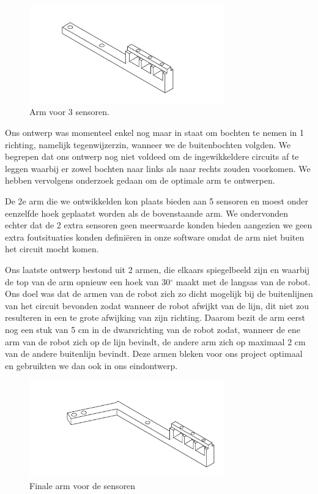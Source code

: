 \begin{figure}[H]
\centering
\includegraphics[width=0.75\textwidth]{3sensoren.png}
\caption{Arm voor 3 sensoren. \label{fig:3sensoren}}
\end{figure}


Ons ontwerp was momenteel enkel nog maar in staat om bochten te nemen in 1 richting, namelijk tegenwijzerzin, wanneer we de buitenbochten volgden. We begrepen dat ons ontwerp nog niet voldeed om de ingewikkeldere circuits af te leggen waarbij er zowel bochten naar links als naar rechts zouden voorkomen. We hebben vervolgens onderzoek gedaan om de optimale arm te ontwerpen.

De 2e arm die we ontwikkelden kon plaats bieden aan 5 sensoren en moest onder eenzelfde hoek geplaatst worden als de bovenstaande arm. We ondervonden echter dat de 2 extra sensoren geen meerwaarde konden bieden aangezien we geen extra foutsituaties konden defini\"eren in onze software omdat de arm niet buiten het circuit mocht komen. 

Ons laatste ontwerp bestond uit 2 armen, die elkaars spiegelbeeld zijn en waarbij de top van de arm opnieuw een hoek van 30$^\circ$ maakt met de langsas van de robot. Ons doel was dat de armen van de robot zich zo dicht mogelijk bij de buitenlijnen van het circuit bevonden zodat wanneer de robot afwijkt van de lijn, dit niet zou resulteren in een te grote afwijking van zijn richting. Daarom bezit de arm eerst nog een stuk van 5 cm in de dwarsrichting van de robot zodat, wanneer de ene arm van de robot zich op de lijn bevindt, de andere arm zich op maximaal 2 cm van de andere buitenlijn bevindt. Deze armen bleken voor ons project optimaal en gebruikten we dan ook in ons eindontwerp.

\begin{figure}[H]
\centering
\includegraphics[width=0.75\textwidth]{schuinnaarvoor.png}
\caption{Finale arm voor de sensoren \label{fig:schuinnaarvoor}}
\end{figure}

